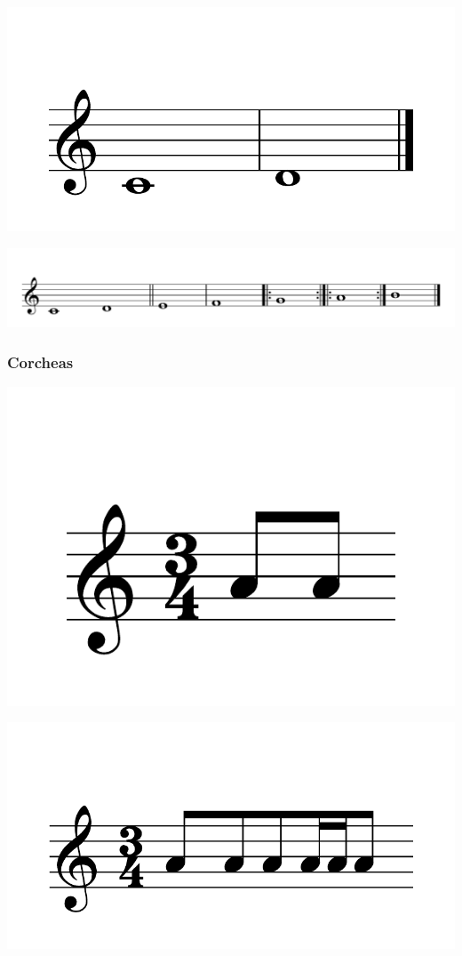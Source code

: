 \documentclass{article}
\begin{document}
\includegraphics[scale=0.5]{figures_tests/pdf/skern/barlines.pdf}

\includegraphics[scale=0.35]{figures_tests/pdf/skern/barlines2.pdf}


\subsubsection{Corcheas}


\includegraphics[scale=0.5]{figures_tests/pdf/skern/beaming0.pdf}

\includegraphics[scale=0.5]{figures_tests/pdf/skern/beaming1.pdf}
\end{document}
